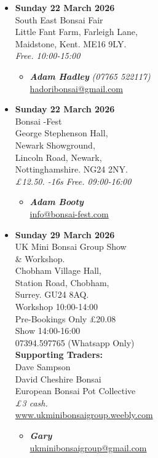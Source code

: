 \begin{itemize}
    \item \textbf{Sunday 22 March 2026}
    \\
    South East Bonsai Fair \\
    Little Fant Farm, Farleigh Lane, \\
    Maidstone, Kent. ME16 9LY.
    \\
    \emph{Free. 10:00-15:00}
    \begin{itemize}
        \item \textbf{\emph{Adam Hadley}} \emph{(07765 522117)} \\
        \href{mailto:hadoribonsai@gmail.com}{hadoribonsai@gmail.com} 
    \end{itemize}

    \item \textbf{Sunday 22 March 2026}
    \\
    Bonsai -Fest \\
    George Stephenson Hall, \\
    Newark Showground, \\
    Lincoln Road, Newark, \\
    Nottinghamshire. NG24 2NY.
    \\
    \emph{£12.50. -16s Free. 09:00-16:00}
    \begin{itemize}
        \item \textbf{\emph{Adam Booty}} \\
        \href{mailto:info@bonsai-fest.com}{info@bonsai-fest.com} 
    \end{itemize}

    \item \textbf{Sunday 29 March 2026}
    \\
    UK Mini Bonsai Group Show \\
    \& Workshop. \\
    Chobham Village Hall, \\
    Station Road, Chobham, \\
    Surrey. GU24 8AQ. \\
    Workshop 10:00-14:00 \\
    Pre-Bookings Only £20.08 \\
    Show 14:00-16:00 \\
    07394.597765 (Whatsapp Only) \\
    \textbf{Supporting Traders:} \\
    Dave Sampson \\
    David Cheshire Bonsai \\
    European Bonsai Pot Collective
    \\
    \emph{£3 cash.}
    \\
    \href{https://www.ukminibonsaigroup.weebly.com}{www.ukminibonsaigroup.weebly.com}
    \begin{itemize}
        \item \textbf{\emph{Gary}} \\
        \href{mailto:ukminibonsaigroup@gmail.com}{ukminibonsaigroup@gmail.com} 
    \end{itemize}


\end{itemize}
